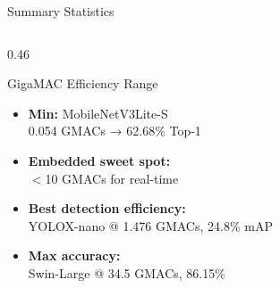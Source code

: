 \documentclass[aspectratio=169,12pt]{beamer}
\begin{document}
\begin{frame}{Summary Statistics}
\begin{columns}[T]
\begin{column}{0.46\textwidth}
      \vspace{0.3cm}
      \begin{block}{GigaMAC Efficiency Range}
        \begin{itemize}\footnotesize
          \item \textbf{Min:} MobileNetV3Lite-S\\
                0.054 GMACs → 62.68\% Top-1
          \item \textbf{Embedded sweet spot:}\\
                $<$10 GMACs for real-time
          \item \textbf{Best detection efficiency:}\\
                YOLOX-nano @ 1.476 GMACs, 24.8\% mAP
          \item \textbf{Max accuracy:}\\
                Swin-Large @ 34.5 GMACs, 86.15\%
        \end{itemize}
      \end{block}
    \end{column}
  \end{columns}
\end{frame}
\end{document}
